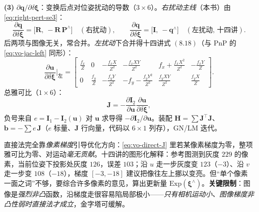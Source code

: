 \begin{derivation}
\textbf{(3)} $\partial\mathbf{q}/\partial\delta\boldsymbol{\xi}$：变换后点对位姿扰动的导数（$3\times6$）。\emph{右扰动主线}（本书）由 \cref{eq:right-pert-se3}：
\begin{equation}
  \frac{\partial\mathbf{q}}{\partial\delta\boldsymbol{\xi}}=\big[\mathbf{R},\ -\mathbf{R}\,\mathbf{P}^\wedge\big]\quad(\text{右扰动}),\qquad
  \frac{\partial\mathbf{q}}{\partial\delta\boldsymbol{\xi}}=\big[\mathbf{I},\ -\mathbf{q}^\wedge\big]\quad(\text{左扰动, 十四讲}).
  \label{eq:vo-direct-dqxi}
\end{equation}
后两项与图像无关，常合并。\emph{左扰动}下合并得十四讲式 $(8.18)$（与 PnP 的 \cref{eq:vo-jac-left} 同形）：
\begin{equation}
  \frac{\partial\mathbf{u}}{\partial\delta\boldsymbol{\xi}}\Big|_{\text{左}}=\begin{bmatrix}
  \frac{f_x}{Z}&0&-\frac{f_xX}{Z^2}&-\frac{f_xXY}{Z^2}&f_x+\frac{f_xX^2}{Z^2}&-\frac{f_xY}{Z}\\
  0&\frac{f_y}{Z}&-\frac{f_yY}{Z^2}&-f_y-\frac{f_yY^2}{Z^2}&\frac{f_yXY}{Z^2}&\frac{f_yX}{Z}
  \end{bmatrix}.
  \label{eq:vo-direct-merge}
\end{equation}
总雅可比（$1\times6$）：
\begin{equation}
  \mathbf{J}=-\frac{\partial\mathbf{I}_2}{\partial\mathbf{u}}\frac{\partial\mathbf{u}}{\partial\delta\boldsymbol{\xi}},
  \label{eq:vo-direct-J}
\end{equation}
负号来自 $e=\mathbf{I}_1-\mathbf{I}_2(\mathbf{u})$ 对 $\mathbf{u}$ 求导得 $-\partial\mathbf{I}_2/\partial\mathbf{u}$。装配 $\mathbf{H}=\sum\mathbf{J}^\top\mathbf{J}$、$\mathbf{b}=-\sum e\,\mathbf{J}$（$e$ 标量、$\mathbf{J}$ 行向量，代码以 $6\times1$ 列存），GN/LM 迭代。
\end{derivation}

\begin{insight}[像素梯度引导优化方向]
直接法完全靠\emph{像素梯度}引导优化方向：\cref{eq:vo-direct-J} 里若某像素梯度为零，整项雅可比为零、对运动\emph{毫无贡献}。十四讲的图形化解释\cite{gaoxiang2019slam14}：参考图测到灰度 $229$ 的像素，当前位姿下投影处灰度 $126$，误差 $103$；沿 $u$ 走一步灰度变 $123$（$-3$）、沿 $v$ 走一步变 $108$（$-18$），梯度 $[-3,-18]$ 建议把像往左上挪以变亮。但“单个像素一面之词”不够，要综合许多像素的意见，算出更新量 $\mathrm{Exp}(\boldsymbol{\xi}^\wedge)$。\textbf{关键限制}：图像是\emph{强烈非凸}函数，沿梯度走很容易陷局部极小——\emph{只有相机运动小、图像梯度非凸性弱时直接法才成立}，金字塔可缓解。
\end{insight}

